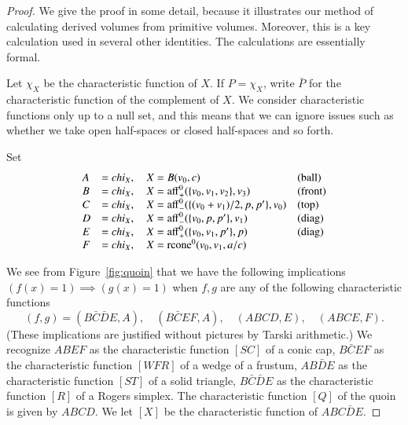 \begin{proof} We give the proof in some detail, because it illustrates
our method of calculating derived volumes from primitive volumes.  Moreover,
this is a key calculation used in several other identities.
The calculations are essentially formal.

Let $\chi_X$ be the characteristic
function of $X$.  If $P = \chi_X$, write $\bar P$ for the characteristic
function of the complement of $X$.  We consider characteristic functions
only up to a null set, and this means that we can ignore issues such
as whether we take open half-spaces or closed half-spaces and so forth.

Set
$$
\begin{array}{llll}
  A &= chi_X,\quad X = B(v_0,c)&\text{(ball)}\\
  B &= chi_X,\quad X = {\operatorname{aff}}_+^0(\{v_0,v_1,v_2\},v_3)&\text{(front)}\\
  C &= chi_X,\quad X = {\operatorname{aff}}_-^0(\{(v_0+v_1)/2,p,p'\},v_0)
    &\text{(top)}\\
  D &= chi_X,\quad X = {\operatorname{aff}}_-^0(\{v_0,p,p'\},v_1)&\text{(diag)}\\
  E &= chi_X,\quad X = {\operatorname{aff}}_+^0(\{v_0,v_1,p'\},p)&\text{(diag)}\\
  F &= chi_X,\quad X = {\operatorname{rcone}}^0(v_0,v_1,a/c)\\
\end{array}
$$

We see from Figure~\ref{fig:quoin} that we have the following implications
$(f(x)=1)\implies (g(x)=1)$ when $f,g$ are any of the following characteristic
functions
  $$
   (f,g) = (B\bar C \bar D E,A),\quad
   (B\bar C E F,A),\quad (A B C D, E),\quad (A B C E,F).
  $$
(These implications are justified without pictures by Tarski arithmetic.)
We recognize $ABEF$ as the characteristic function $[SC]$ of a
conic cap, $B\bar C E F$ as the characteristic function $[WFR]$ of a
wedge of a frustum,  $AB\bar D E$ as the characteristic function $[ST]$
of a solid triangle, $B\bar C\bar D E$ as the characteristic function $[R]$
of a Rogers simplex.  The characteristic function $[Q]$
of the quoin is given
by $A B C D$.  We let $[X]$ be the characteristic function of
$A B C \bar D E$.


\end{proof}
